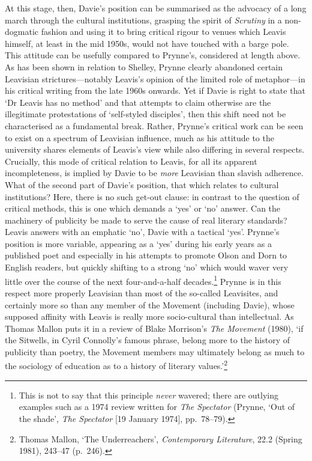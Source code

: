 \documentclass[]{article}
\begin{document}
\noindent At this stage, then, Davie’s position can be summarised as the
advocacy of a long march through the cultural institutions, grasping the
spirit of \emph{Scrutiny} in a non-dogmatic fashion and using it to
bring critical rigour to venues which Leavis himself, at least in the
mid 1950s, would not have touched with a barge pole. This attitude can
be usefully compared to Prynne’s, considered at length above. As has
been shown in relation to Shelley, Prynne clearly abandoned certain
Leavisian strictures—notably Leavis’s opinion of the limited role of
metaphor—in his critical writing from the late 1960s onwards. Yet if
Davie is right to state that ‘Dr Leavis has no method’ and that attempts
to claim otherwise are the illegitimate protestations of ‘self-styled
disciples’, then this shift need not be characterised as a fundamental
break. Rather, Prynne’s critical work can be seen to exist on a spectrum
of Leavisian influence, much as his attitude to the university shares
elements of Leavis’s view while also differing in several respects.
Crucially, this mode of critical relation to Leavis, for all its
apparent incompleteness, is implied by Davie to be \emph{more} Leavisian
than slavish adherence. What of the second part of Davie’s position,
that which relates to cultural institutions? Here, there is no such
get-out clause: in contrast to the question of critical methods, this is
one which demands a ‘yes’ or ‘no’ answer. Can the machinery of publicity
be made to serve the cause of real literary standards? Leavis answers
with an emphatic ‘no’, Davie with a tactical ‘yes’. Prynne’s position is
more variable, appearing as a ‘yes’ during his early years as a
published poet and especially in his attempts to promote Olson and Dorn
to English readers, but quickly shifting to a strong ‘no’ which would
waver very little over the course of the next four-and-a-half
decades.\footnote{This is not to say that this principle \emph{never}
  wavered; there are outlying examples such as a 1974 review written for
  \emph{The Spectator} (Prynne, ‘Out of the shade’, \emph{The Spectator}
  {[}19 January 1974{]}, pp.~78–79).} Prynne is in this respect more
properly Leavisian than most of the so-called Leavisites, and certainly
more so than any member of the Movement (including Davie), whose
supposed affinity with Leavis is really more socio-cultural than
intellectual. As Thomas Mallon puts it in a review of Blake Morrison’s
\emph{The Movement} (1980), ‘if the Sitwells, in Cyril Connolly’s famous
phrase, belong more to the history of publicity than poetry, the
Movement members may ultimately belong as much to the sociology of
education as to a history of literary values.’\footnote{Thomas Mallon,
  ‘The Underreachers’, \emph{Contemporary Literature}, 22.2 (Spring
  1981), 243–47 (p.~246).} \newpage
\end{document}
